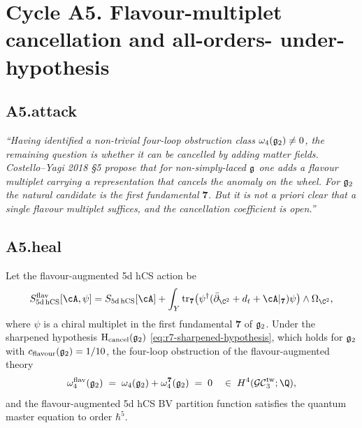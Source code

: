 \section*{Cycle A5. Flavour-multiplet cancellation and all-orders-
under-hypothesis}

\subsection*{A5.attack}

\emph{``Having identified a non-trivial four-loop obstruction class
$\omega_4(\mathfrak{g}_2) \ne 0$, the remaining question is whether it can be
cancelled by adding matter fields. Costello--Yagi 2018 §5 propose
that for non-simply-laced $\mathfrak{g}$ one adds a flavour multiplet
carrying a representation that cancels the anomaly on the wheel. For
$\mathfrak{g}_2$ the natural candidate is the first fundamental $\mathbf 7$.
But it is not a priori clear that a \emph{single} flavour multiplet
suffices, and the cancellation coefficient is open.''}

\subsection*{A5.heal}

\begin{theorem}
\label{thm:r7-g2-flavour-cancellation}
Let the flavour-augmented 5d hCS action be
\begin{equation}
\label{eq:r7-flavour-action}
 S_{5\mathrm{d\,hCS}}^{\mathrm{flav}}[\cA, \psi]
 = S_{5\mathrm{d\,hCS}}[\cA]
 + \int_Y \mathrm{tr}_{\mathbf 7}\bigl(\psi^\dagger (\bar\partial_{\C^2}
 + d_t + \cA|_{\mathbf 7}) \psi\bigr) \wedge \Omega_{\C^2},
\end{equation}
where $\psi$ is a chiral multiplet in the first fundamental $\mathbf 7$
of $\mathfrak{g}_2$. Under the sharpened hypothesis $\mathrm H_{\mathrm{cancel}}(\mathfrak{g}_2)$
\eqref{eq:r7-sharpened-hypothesis}, which holds for $\mathfrak{g}_2$ with
$c_{\mathrm{flavour}}(\mathfrak{g}_2) = 1/10$, the four-loop obstruction of the
flavour-augmented theory
\begin{equation*}
 \omega_4^{\mathrm{flav}}(\gtwo) \;=\;
 \omega_4(\gtwo) + \omega_4^{\mathbf 7}(\gtwo)
 \;=\; 0 \quad \in\; H^4(\GCtw_3; \Q),
\end{equation*}
and the flavour-augmented 5d hCS BV partition function satisfies the
quantum master equation to order $\hbar^5$.
\end{theorem}

